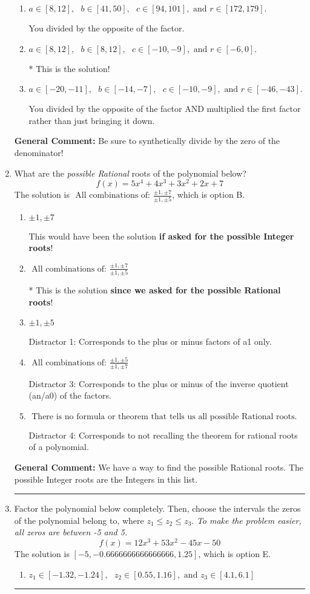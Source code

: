 \documentclass{extbook}[14pt]
\newcommand{\litem}[1]{\item #1

\rule{\textwidth}{0.4pt}}
\begin{document}
\begin{enumerate}
{\begin{enumerate}[label=\Alph*.]
 You multiplied by the synthetic number rather than bringing the first factor down.
\item \( a \in [8, 12], \text{   } b \in [41, 50], \text{   } c \in [94, 101], \text{   and   } r \in [172, 179]. \)

 You divided by the opposite of the factor.
\item \( a \in [8, 12], \text{   } b \in [8, 12], \text{   } c \in [-10, -9], \text{   and   } r \in [-6, 0]. \)

* This is the solution!
\item \( a \in [-20, -11], \text{   } b \in [-14, -7], \text{   } c \in [-10, -9], \text{   and   } r \in [-46, -43]. \)

 You divided by the opposite of the factor AND multiplied the first factor rather than just bringing it down.
\end{enumerate}

\textbf{General Comment:} Be sure to synthetically divide by the zero of the denominator!
}
\litem{
What are the \textit{possible Rational} roots of the polynomial below?
\[ f(x) = 5x^{4} +4 x^{3} +3 x^{2} +2 x + 7 \]The solution is \( \text{ All combinations of: }\frac{\pm 1,\pm 7}{\pm 1,\pm 5} \), which is option B.\begin{enumerate}[label=\Alph*.]
\item \( \pm 1,\pm 7 \)

This would have been the solution \textbf{if asked for the possible Integer roots}!
\item \( \text{ All combinations of: }\frac{\pm 1,\pm 7}{\pm 1,\pm 5} \)

* This is the solution \textbf{since we asked for the possible Rational roots}!
\item \( \pm 1,\pm 5 \)

 Distractor 1: Corresponds to the plus or minus factors of a1 only.
\item \( \text{ All combinations of: }\frac{\pm 1,\pm 5}{\pm 1,\pm 7} \)

 Distractor 3: Corresponds to the plus or minus of the inverse quotient (an/a0) of the factors. 
\item \( \text{ There is no formula or theorem that tells us all possible Rational roots.} \)

 Distractor 4: Corresponds to not recalling the theorem for rational roots of a polynomial.
\end{enumerate}

\textbf{General Comment:} We have a way to find the possible Rational roots. The possible Integer roots are the Integers in this list.
}
\litem{
Factor the polynomial below completely. Then, choose the intervals the zeros of the polynomial belong to, where $z_1 \leq z_2 \leq z_3$. \textit{To make the problem easier, all zeros are between -5 and 5.}
\[ f(x) = 12x^{3} +53 x^{2} -45 x -50 \]The solution is \( [-5, -0.6666666666666666, 1.25] \), which is option E.\begin{enumerate}[label=\Alph*.]
\item \( z_1 \in [-1.32, -1.24], \text{   }  z_2 \in [0.55, 1.16], \text{   and   } z_3 \in [4.1, 6.1] \)


\end{enumerate}}
\end{enumerate}
\end{document}
